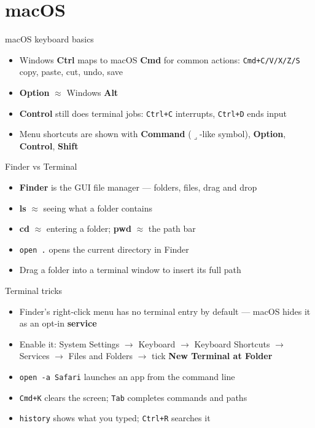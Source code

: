 \section{macOS}

\begin{frame}[fragile]{macOS keyboard basics}
	\begin{itemize}
		\item Windows \textbf{Ctrl} maps to macOS \textbf{Cmd} for common actions: \texttt{Cmd+C/V/X/Z/S} copy, paste, cut, undo, save
		\item \textbf{Option} $\approx$ Windows \textbf{Alt}
		\item \textbf{Control} still does terminal jobs: \texttt{Ctrl+C} interrupts, \texttt{Ctrl+D} ends input
		\item Menu shortcuts are shown with \textbf{Command} ($\lrcorner$-like symbol), \textbf{Option}, \textbf{Control}, \textbf{Shift}
	\end{itemize}
\end{frame}

\begin{frame}[fragile]{Finder vs Terminal}
	\begin{itemize}
		\item \textbf{Finder} is the GUI file manager — folders, files, drag and drop
		\item \textbf{ls} $\approx$ seeing what a folder contains
		\item \textbf{cd} $\approx$ entering a folder; \textbf{pwd} $\approx$ the path bar
		\item \texttt{open .} opens the current directory in Finder
		\item Drag a folder into a terminal window to insert its full path
	\end{itemize}
\end{frame}

\begin{frame}[fragile]{Terminal tricks}
	\begin{itemize}
		\item Finder's right-click menu has no terminal entry by default — macOS hides it as an opt-in \textbf{service}
		\item Enable it: System Settings $\rightarrow$ Keyboard $\rightarrow$ Keyboard Shortcuts $\rightarrow$ Services $\rightarrow$ Files and Folders $\rightarrow$ tick \textbf{New Terminal at Folder}
		\item \texttt{open -a Safari} launches an app from the command line
		\item \texttt{Cmd+K} clears the screen; \texttt{Tab} completes commands and paths
		\item \texttt{history} shows what you typed; \texttt{Ctrl+R} searches it
	\end{itemize}
\end{frame}

